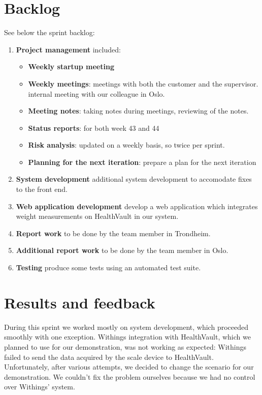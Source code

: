 \section{Backlog}
See below the sprint backlog:
\begin{enumerate}[1.]
\item \textbf{Project management} included:
	\begin{itemize}
		\item \textbf{Weekly startup meeting}
		\item \textbf{Weekly meetings}: 
			meetings with both the customer and the supervisor. internal meeting with our colleague in Oslo.
		\item \textbf{Meeting notes}:
			taking notes during meetings, reviewing of the notes.
		\item \textbf{Status reports}:
			for both week 43 and 44
		\item \textbf{Risk analysis}:
			updated on a weekly basis, so twice per sprint.
		\item \textbf{Planning for the next iteration}:
			prepare a plan for the next iteration
	\end{itemize}
	\item \textbf{System development}
		additional system development to accomodate fixes to the front end.
	\item \textbf{Web application development}
		develop a web application which integrates weight measurements
		on HealthVault in our system.
	\item \textbf{Report work}
		to be done by the team member in Trondheim.
	\item \textbf{Additional report work}
		to be done by the team member in Oslo.
	\item \textbf{Testing}
		produce some tests using an automated test suite.
\end{enumerate}

\section{Results and feedback}

During this sprint we worked mostly on system development, which proceeded smoothly
with one exception. Withings integration with HealthVault, which we planned to use for
our demonstration, was not working as expected: Withings failed to send the data acquired
by the scale device to HealthVault. Unfortunately, after various attempts, we decided
to change the scenario for our demonstration. We couldn't fix the problem
ourselves because we had no control over Withings' system.

